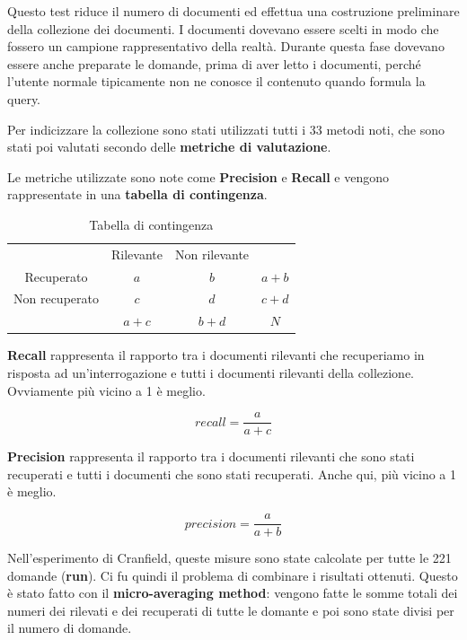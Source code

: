 Questo test riduce il numero di documenti ed effettua una costruzione preliminare della collezione dei documenti. I documenti dovevano essere scelti in modo che fossero un campione rappresentativo della realtà. Durante questa fase dovevano essere anche preparate le domande, prima di aver letto i documenti, perché l'utente normale tipicamente non ne conosce il contenuto quando formula la query.

Per indicizzare la collezione sono stati utilizzati tutti i 33 metodi noti, che sono stati poi valutati secondo delle \textbf{metriche di valutazione}.

Le metriche utilizzate sono note come \textbf{Precision} e \textbf{Recall} e vengono rappresentate in una \textbf{tabella di contingenza}.

\begin{table}[htbp]
	\centering	
	\begin{tabular}{cccc}
		\cline{2-3}
		\multicolumn{1}{c|}{}                & \multicolumn{1}{c|}{Rilevante} & \multicolumn{1}{c|}{Non rilevante} &     \\ \cline{1-3}
		\multicolumn{1}{|c|}{Recuperato}     & \multicolumn{1}{c|}{$a$}         & \multicolumn{1}{c|}{$b$}             & $a+b$ \\ \cline{1-3}
		\multicolumn{1}{|c|}{Non recuperato} & \multicolumn{1}{c|}{$c$}         & \multicolumn{1}{c|}{$d$}             & $c+d$ \\ \cline{1-3}
		& $a+c$                            & $b+d$                                & $N$  
	\end{tabular}
	\caption{Tabella di contingenza}
\end{table}

\noindent \textbf{Recall} rappresenta il rapporto tra i documenti rilevanti che recuperiamo in risposta ad un'interrogazione e tutti i documenti rilevanti della collezione. Ovviamente più vicino a 1 è meglio.

$$
recall = \frac{a}{a+c}
$$

\noindent \textbf{Precision} rappresenta il rapporto tra i documenti rilevanti che sono stati recuperati e tutti i documenti che sono stati recuperati. Anche qui, più vicino a 1 è meglio.

$$
precision = \frac{a}{a+b}
$$

Nell'esperimento di Cranfield, queste misure sono state calcolate per tutte le 221 domande (\textbf{run}).
Ci fu quindi il problema di combinare i risultati ottenuti. Questo è stato fatto con il \textbf{micro-averaging method}: vengono fatte le somme totali dei numeri dei rilevati e dei recuperati di tutte le domante e poi sono state divisi per il numero di domande.

